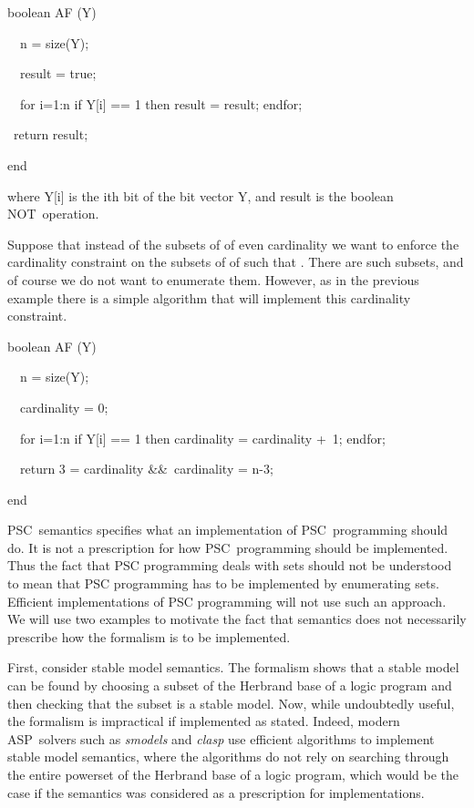 \documentclass[letterpaper]{article}\usepackage{aaai}
\begin{document}
{\small boolean AF (Y)\ }

{\small \ \ n = size(Y);}

{\small \ \ result = true;}

{\small \ \ for i=1:n if Y[i] == 1 then result = result; endfor;}

\ {\small return result;}

{\small end}

where Y[i] is the ith bit of the bit vector Y, and result is the
boolean NOT\ operation.

Suppose that instead of the subsets of  of even cardinality we want to
enforce the cardinality constraint on the subsets of  of  such that
. There are
 such
subsets, and of course we do not want to enumerate them. However, as in the
previous example there is a simple algorithm that will implement this
cardinality constraint.

{\small boolean AF (Y)\ }

{\small \ \ n = size(Y);}

{\small \ \ cardinality = 0;}

{\small \ \ for i=1:n if Y[i] == 1 then cardinality = cardinality +\ 1;
endfor;}

{\small \ \ return 3
= cardinality \&\&\ cardinality
= n-3;}

{\small end}

PSC\ semantics specifies what an implementation of PSC\ programming should do.
It is not a prescription for how PSC\ programming should be implemented. Thus
the fact that PSC programming deals with sets should not be understood to mean
that PSC programming has to be implemented by enumerating sets. Efficient
implementations of PSC programming will not use such an approach. We will use
two examples to motivate the fact that semantics does not necessarily
prescribe how the formalism is to be implemented.

First, consider stable model semantics. The formalism shows that a stable
model can be found by choosing a subset of the Herbrand base of a logic
program and then checking that the subset is a stable model. Now, while
undoubtedly useful, the formalism is impractical if implemented as stated.
Indeed, modern ASP\ solvers such as \emph{smodels }\cite{SimonsNS02} and
\emph{clasp }\cite{GebserKNS07} use efficient algorithms to implement stable
model semantics, where the algorithms do not rely on searching through the
entire powerset of the Herbrand base of a logic program, which would be the
case if the semantics was considered as a prescription for implementations.
\end{document}
